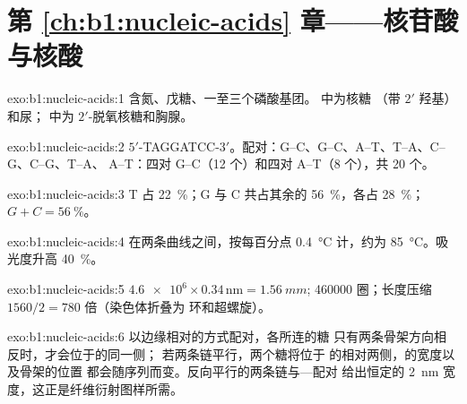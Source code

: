 \section*{第 \ref{ch:b1:nucleic-acids} 章——核苷酸与核酸}

\begin{solution}{exo:b1:nucleic-acids:1}
含氮、戊糖、一至三个磷酸基团。 中为核糖
（带 $2'$ 羟基）和尿； 中为 $2'$-脱氧核糖和胸腺。
\end{solution}

\begin{solution}{exo:b1:nucleic-acids:2}
$5'$-TAGGATCC-$3'$。配对：G--C、G--C、A--T、T--A、C--G、C--G、T--A、
A--T：四对 G--C（12 个）和四对 A--T（8 个），共 20 个。
\end{solution}

\begin{solution}{exo:b1:nucleic-acids:3}
T 占 \qty{22}{\%}；G 与 C 共占其余的 \qty{56}{\%}，各占
\qty{28}{\%}；$G + C = \qty{56}{\%}$。
\end{solution}

\begin{solution}{exo:b1:nucleic-acids:4}
在两条曲线之间，按每百分点 \qty{0.4}{\celsius} 计，约为
\qty{85}{\celsius}。吸光度升高 \qty{40}{\%}。
\end{solution}

\begin{solution}{exo:b1:nucleic-acids:5}
$\num{4.6e6}\times 0.34\,\mathrm{nm} = \qty{1.56}{mm}$; \num{460000}
圈；长度压缩 $1560/2 = 780$ 倍（染色体折叠为
环和超螺旋）。
\end{solution}

\begin{solution}{exo:b1:nucleic-acids:6}
以边缘相对的方式配对，各所连的糖
只有两条骨架方向相反时，才会位于的同一侧；
若两条链平行，两个糖将位于
的相对两侧，的宽度以及骨架的位置
都会随序列而变。反向平行的两条链与—配对
给出恒定的 \qty{2}{nm}
宽度，这正是纤维衍射图样所需。
\end{solution}

